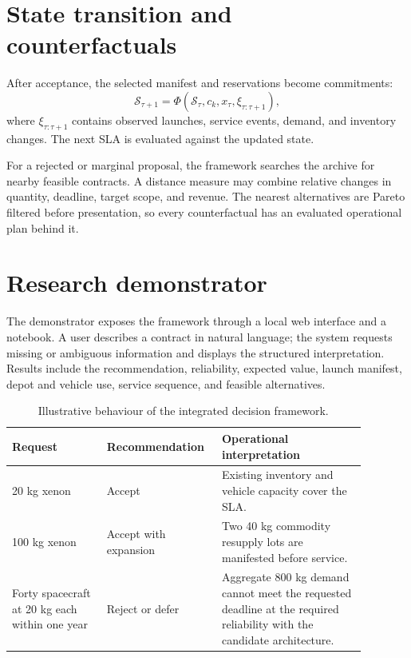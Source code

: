\documentclass[review,12pt,authoryear]{elsarticle}
\newcommand{\state}{\mathcal{S}}
\begin{document}
\section{State transition and counterfactuals}
\label{sec:rolling}

After acceptance, the selected manifest and reservations become commitments:
\begin{equation}
 \state_{\tau+1}=
 \Phi(\state_\tau,c_k,x_\tau,\xi_{\tau:\tau+1}),
\end{equation}
where $\xi_{\tau:\tau+1}$ contains observed launches, service events, demand,
and inventory changes. The next SLA is evaluated against the updated state.

For a rejected or marginal proposal, the framework searches the archive for
nearby feasible contracts. A distance measure may combine relative changes in
quantity, deadline, target scope, and revenue. The nearest alternatives are
Pareto filtered before presentation, so every counterfactual has an evaluated
operational plan behind it.

\section{Research demonstrator}
\label{sec:demonstrator}

The demonstrator exposes the framework through a local web interface and a
notebook. A user describes a contract in natural language; the system requests
missing or ambiguous information and displays the structured interpretation.
Results include the recommendation, reliability, expected value, launch
manifest, depot and vehicle use, service sequence, and feasible alternatives.

\begin{table}[ht]
\centering
\caption{Illustrative behaviour of the integrated decision framework.}
\label{tab:cases}
\begin{tabular}{p{0.25\linewidth}p{0.25\linewidth}p{0.38\linewidth}}
\toprule
Request & Recommendation & Operational interpretation\\
\midrule
20 kg xenon & Accept & Existing inventory and vehicle capacity cover the SLA.\\
100 kg xenon & Accept with expansion & Two 40 kg commodity resupply lots are
manifested before service.\\
Forty spacecraft at 20 kg each within one year & Reject or defer & Aggregate
800 kg demand cannot meet the requested deadline at the required reliability
with the candidate architecture.\\
\bottomrule
\end{tabular}
\end{table}
\end{document}
